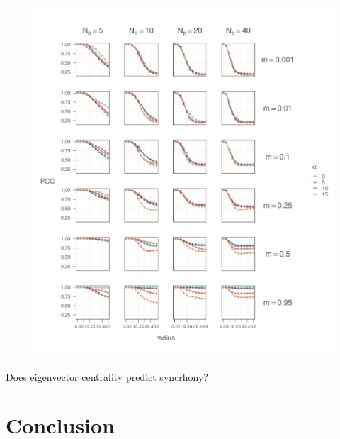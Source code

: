 \documentclass[]{article}
\begin{document}
\begin{figure}
    \includegraphics[width=15cm]{figs/figure10}
    \caption{}
    \label{}
\end{figure}

Does eigenvector centrality predict syncrhony?


\hypertarget{conclusion}{%
\section{Conclusion}\label{conclusion}}

\clearpage
{
\footnotesize

}
\end{document}
